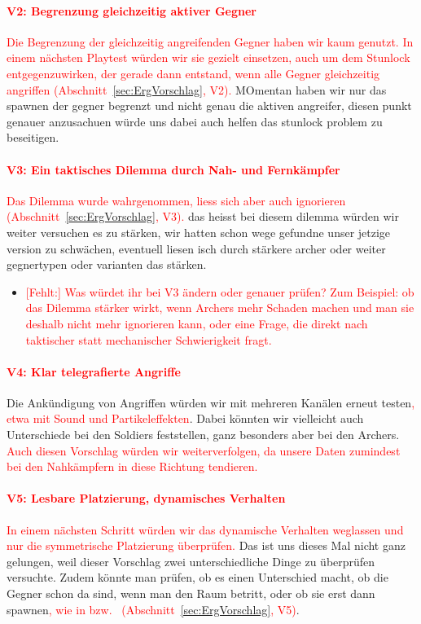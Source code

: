 \documentclass[../Main.tex]{subfiles}
\begin{document}
\paragraph{\textcolor{red}{V2: Begrenzung gleichzeitig aktiver Gegner}}
\textcolor{red}{Die Begrenzung der gleichzeitig angreifenden Gegner haben wir kaum genutzt. In einem nächsten Playtest würden wir sie gezielt einsetzen, auch um dem Stunlock entgegenzuwirken, der gerade dann entstand, wenn alle Gegner gleichzeitig angriffen (Abschnitt~\ref{sec:ErgVorschlag}, V2).} MOmentan haben wir nur das spawnen der gegner begrenzt und nicht genau die aktiven angreifer, diesen punkt genauer anzusachuen würde uns dabei auch helfen das stunlock problem zu beseitigen.

\paragraph{\textcolor{red}{V3: Ein taktisches Dilemma durch Nah- und Fernkämpfer}}
\textcolor{red}{Das Dilemma wurde wahrgenommen, liess sich aber auch ignorieren (Abschnitt~\ref{sec:ErgVorschlag}, V3).} das heisst bei diesem dilemma würden wir weiter versuchen es zu stärken, wir hatten schon wege gefundne unser jetzige version zu schwächen, eventuell liesen isch durch stärkere archer oder weiter gegnertypen oder varianten das stärken.

\begin{itemize}[leftmargin=1.5cm]
    \item \textcolor{red}{[Fehlt:] Was würdet ihr bei V3 ändern oder genauer prüfen? Zum Beispiel: ob das Dilemma stärker wirkt, wenn Archers mehr Schaden machen und man sie deshalb nicht mehr ignorieren kann, oder eine Frage, die direkt nach taktischer statt mechanischer Schwierigkeit fragt.}
\end{itemize}

\paragraph{\textcolor{red}{V4: Klar telegrafierte Angriffe}}
Die Ankündigung von Angriffen würden wir mit mehreren Kanälen erneut testen\textcolor{red}{, etwa mit Sound und Partikeleffekten}. Dabei könnten wir vielleicht auch Unterschiede bei den Soldiers feststellen, ganz besonders aber bei den Archers. \textcolor{red}{Auch diesen Vorschlag würden wir weiterverfolgen, da unsere Daten zumindest bei den Nahkämpfern in diese Richtung tendieren.}

\paragraph{\textcolor{red}{V5: Lesbare Platzierung, dynamisches Verhalten}}
\textcolor{red}{In einem nächsten Schritt würden wir das dynamische Verhalten weglassen und nur die symmetrische Platzierung überprüfen.} Das ist uns dieses Mal nicht ganz gelungen, weil dieser Vorschlag zwei unterschiedliche Dinge zu überprüfen versuchte. Zudem könnte man prüfen, ob es einen Unterschied macht, ob die Gegner schon da sind, wenn man den Raum betritt, oder ob sie erst dann spawnen\textcolor{red}{, wie in  bzw.\  (Abschnitt~\ref{sec:ErgVorschlag}, V5)}.
\end{document}
